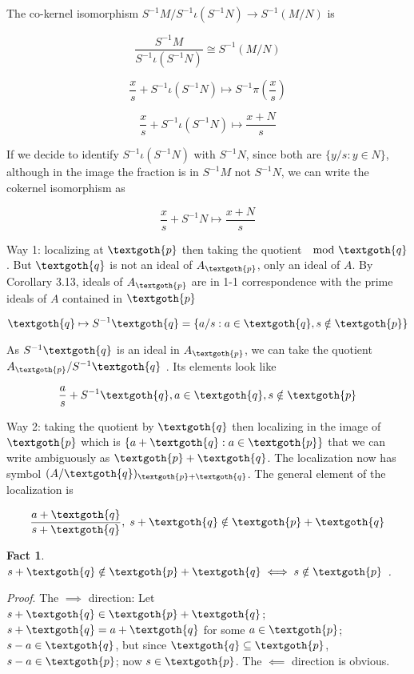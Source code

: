 \documentclass{article}
\newtheorem{theorem}{Fact}
\begin{document}
The co-kernel isomorphism $S^{-1}M/S^{-1}\iota(S^{-1}N) \rightarrow S^{-1}(M/N)$ is

\[
\frac{S^{-1}M}{S^{-1}\iota(S^{-1}N)} \cong S^{-1}(M/N)
\]

\[
\frac{x}{s} + S^{-1}\iota(S^{-1}N) \mapsto S^{-1}\pi(\frac{x}{s})
\]

\[
\frac{x}{s} + S^{-1}\iota(S^{-1}N) \mapsto \frac{x + N}{s}
\]

If we decide to identify $S^{-1}\iota(S^{-1}N)$ with $S^{-1}N$, since both are $\{ y/s: y \in N \}$, although in the image the fraction is in $S^{-1}M$ not $S^{-1}N$, we can write the cokernel isomorphism as

\[
\frac{x}{s} + S^{-1}N \mapsto \frac{x + N}{s}
\]

Way 1: localizing at $\textgoth{p}$ then taking the quotient $\mod \textgoth{q}$ . But $\textgoth{q}$ is not an ideal of $A_\textgoth{p}$, only an ideal of $A$. By Corollary 3.13, ideals of $A_\textgoth{p}$ are in 1-1 correspondence with the prime ideals of $A$ contained in $\textgoth{p}$

\[
\textgoth{q} \mapsto S^{-1}\textgoth{q} = \{a/s: a \in \textgoth{q}, s \notin \textgoth{p}\}
\]

\noindent
As $S^{-1}\textgoth{q}$ is an ideal in $A_\textgoth{p}$, we can take the quotient $A_\textgoth{p} / S^{-1}\textgoth{q}$ . Its elements look like 

\[
\frac{a}{s} + S^{-1}\textgoth{q}, a \in \textgoth{q}, s \notin \textgoth{p}
\]

Way 2: taking the quotient by $\textgoth{q}$ then localizing in the image of $\textgoth{p}$ which is $\{ a + \textgoth{q}: a \in \textgoth{p} \}$ that we can write ambiguously as $\textgoth{p} + \textgoth{q}$. The localization now has symbol $(A/\textgoth{q})_{\textgoth{p} + \textgoth{q}}$. The general element of the localization is 

\[
\frac{a + \textgoth{q}}{s + \textgoth{q}}, \; s + \textgoth{q} \notin \textgoth{p} + \textgoth{q}
\]

\begin{theorem}
$s + \textgoth{q} \notin \textgoth{p} + \textgoth{q} \iff s \notin \textgoth{p}$ .
\end{theorem}

\noindent 
\textit{Proof}. The $\implies$ direction: Let $s + \textgoth{q} \in \textgoth{p} + \textgoth{q}$; $s + \textgoth{q} = a + \textgoth{q}$ for some $a \in \textgoth{p}$; $s - a \in \textgoth{q}$, but since $\textgoth{q} \subseteq \textgoth{p}$, $s - a \in \textgoth{p}$; now $s \in \textgoth{p}$. The $\impliedby$ direction is obvious.
\end{document}
